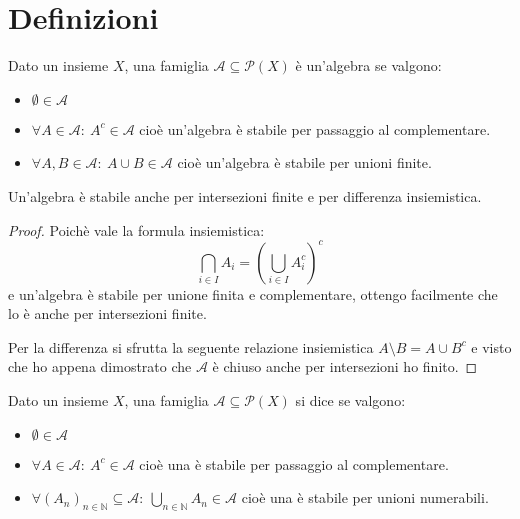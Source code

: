 \section{Definizioni}
\begin{definition}[Algebra]
	Dato un insieme $X$, una famiglia $\mathcal A\subseteq\mathcal P(X)$ è un'algebra se valgono:
	\begin{itemize}
		\item $\emptyset\in\mathcal A$
		\item $\forall A\in\mathcal A:\ A^c\in\mathcal A$ cioè un'algebra è stabile per passaggio al complementare.
		\item $\forall A,B\in\mathcal A:\ A\cup B\in\mathcal A$ cioè un'algebra è stabile per unioni finite.
	\end{itemize}
\end{definition}
\begin{remark}\label{ProprietaAlg}
	Un'algebra è stabile anche per intersezioni finite e per differenza insiemistica.
\end{remark}
\begin{proof}
	Poichè vale la formula insiemistica:
	\begin{equation*}
		\bigcap_{i\in I} A_i = \left( \bigcup_{i\in I} A_i^c \right)^c
	\end{equation*}
	e un'algebra è stabile per unione finita e complementare, ottengo facilmente che lo è anche per intersezioni finite.
	
	Per la differenza si sfrutta la seguente relazione insiemistica $A\setminus B=A\cup B^c$ e visto che ho appena dimostrato che $\mathcal A$ è chiuso anche per intersezioni ho finito.
\end{proof}


\begin{definition}[\sigalg{}]
	Dato un insieme $X$, una famiglia $\mathcal A\subseteq\mathcal P (X)$ si dice \sigalg{} se valgono:
	\begin{itemize}
	\item $\emptyset\in \mathcal A$
	\item $\forall A\in \mathcal A:\ A^c\in \mathcal A$ cioè una \sigalg{} è stabile per passaggio al complementare.
	\item $\forall (A_n)_{n\in\mathbb N}\subseteq \mathcal A:\ \bigcup_{n\in\mathbb N} A_n\in \mathcal A$ cioè una \sigalg{} è stabile per unioni numerabili.  
	\end{itemize}
\end{definition}

